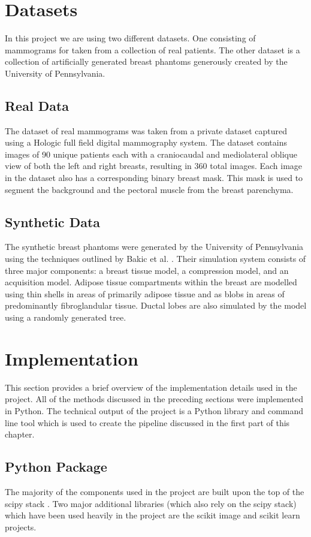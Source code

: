 \section{Datasets}
\label{sec:datasets}
In this project we are using two different datasets. One consisting of mammograms for taken from a collection of real patients. The other dataset is a collection of artificially generated breast phantoms generously created by the University of Pennsylvania. 

\subsection{Real Data}
The dataset of real mammograms was taken from a private dataset captured using a Hologic full field digital mammography system. The dataset contains images of 90 unique patients each with a craniocaudal and mediolateral oblique view of both the left and right breasts, resulting in 360 total images. Each image in the dataset also has a corresponding binary breast mask. This mask is used to segment the  background and the pectoral muscle from the breast parenchyma.

\subsection{Synthetic Data}
The synthetic breast phantoms were generated by the University of Pennsylvania using the techniques outlined by Bakic et al. \cite{bakic2002mammogram1, bakic2002mammogram2, bakic2003mammogram3}. Their simulation system consists of three major components: a breast tissue model, a compression model, and an acquisition model. Adipose tissue compartments within the breast are modelled using thin shells in areas of primarily adipose tissue and as blobs in areas of predominantly fibroglandular tissue. Ductal lobes are also simulated by the model using a randomly generated tree. 

\section{Implementation}
\label{sec:implementation}
This section provides a brief overview of the implementation details used in the project. All of the methods discussed in the preceding sections were implemented in Python. The technical output of the project is a Python library and command line tool which is used to create the pipeline discussed in the first part of this chapter.

\subsection{Python Package}
The majority of the components used in the project are built upon the top of the scipy stack \cite{jones2014scipy}. Two major additional libraries (which also rely on the scipy stack) which have been used heavily in the project are the scikit image \cite{van2014scikit} and scikit learn \cite{pedregosa2011scikit} projects.

